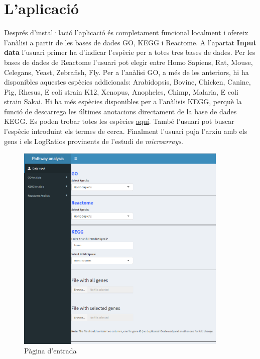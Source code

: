 \chapter{L'aplicació}

Després d'instal·lació l'aplicació és completament funcional localment i ofereix l'anàlisi a partir de les bases de dades GO, KEGG i Reactome. A l'apartat \textbf{Input data} l'usuari primer ha d'indicar l'espècie per a totes tres bases de dades. Per les bases de dades de Reactome l'usuari pot elegir entre Homo Sapiens, Rat, Mouse, Celegans, Yeast, Zebrafish, Fly. Per a l’anàlisi GO, a més de les anteriors, hi ha disponibles aquestes espècies addicionals: Arabidopsis, Bovine, Chicken, Canine, Pig, Rhesus, E coli strain K12, Xenopus, Anopheles, Chimp, Malaria, E coli strain Sakai. Hi ha més espècies disponibles per a l'anàlisis KEGG, perquè la funció de   descarrega les últimes anotacions directament de la base de dades KEGG. Es poden trobar totes les espècies \href{http://www.genome.jp/kegg/catalog/org_list.html}{aquí}. També l'usuari pot buscar l'espècie introduint els termes de cerca. Finalment l'usuari puja l'arxiu amb els gens i els LogRatios provinents de l'estudi de \textit{microarrays}. 


\begin{figure}[H]
\caption{Pàgina d'entrada}
\centering
\includegraphics[width=0.9\textwidth]{figures/App_F1.png}
\end{figure}

